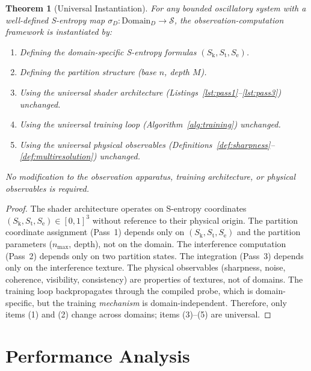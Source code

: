 \documentclass[11pt,twocolumn,a4paper]{article}
\newtheorem{theorem}{Theorem}[section]
\theoremstyle{definition}
\theoremstyle{remark}
\newcommand{\Sk}{S_{\mathrm{k}}}
\newcommand{\St}{S_{\mathrm{t}}}
\newcommand{\Se}{S_{\mathrm{e}}}
\newcommand{\Sspace}{\mathcal{S}}
\begin{document}
\begin{theorem}[Universal Instantiation]
\label{thm:universal_instantiation}
For any bounded oscillatory system with a well-defined S-entropy map $\sigma_D: \text{Domain}_D \to \Sspace$, the observation-computation framework is instantiated by:
\begin{enumerate}[nosep]
\item Defining the domain-specific S-entropy formulas $(\Sk, \St, \Se)$.
\item Defining the partition structure (base $n$, depth $M$).
\item Using the universal shader architecture (Listings~\ref{lst:pass1}--\ref{lst:pass3}) unchanged.
\item Using the universal training loop (Algorithm~\ref{alg:training}) unchanged.
\item Using the universal physical observables (Definitions~\ref{def:sharpness}--\ref{def:multiresolution}) unchanged.
\end{enumerate}
No modification to the observation apparatus, training architecture, or physical observables is required.
\end{theorem}

\begin{proof}
The shader architecture operates on S-entropy coordinates $(\Sk, \St, \Se) \in [0,1]^3$ without reference to their physical origin. The partition coordinate assignment (Pass~1) depends only on $(\Sk, \St, \Se)$ and the partition parameters ($n_{\max}$, depth), not on the domain. The interference computation (Pass~2) depends only on two partition states. The integration (Pass~3) depends only on the interference texture. The physical observables (sharpness, noise, coherence, visibility, consistency) are properties of textures, not of domains. The training loop backpropagates through the compiled probe, which is domain-specific, but the training \emph{mechanism} is domain-independent. Therefore, only items (1) and (2) change across domains; items (3)--(5) are universal.
\end{proof}



\part{Performance Analysis}
\end{document}
